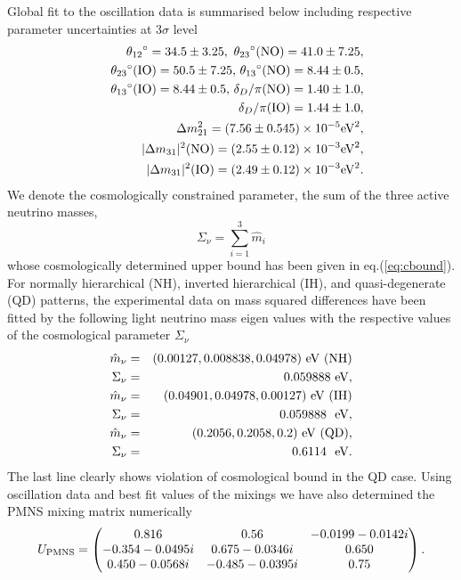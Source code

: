 \documentclass[a4paper,11pt]{article}
\newcommand{\be}{\begin{equation}}
\newcommand{\ee}{\end{equation}}
\newcommand{\bea}{\begin{eqnarray}}
\newcommand{\eea}{\end{eqnarray}}
\begin{document}
 Global fit to the oscillation data \cite{Salas:2017}  is summarised below
 including respective parameter uncertainties at  $3\sigma$ level
\begin{eqnarray}
&&\theta_{12}\/^{\circ}=34.5\pm 3.25,\,\, \theta_{23}\/^{\circ}({\rm NO})=41.0\pm 7.25,\nonumber \\
&& \theta_{23}\/^{\circ}({\rm IO})=50.5\pm 7.25,\,\theta_{13}\/^{\circ}({\rm NO})=8.44\pm0.5,\nonumber\\
&&\theta_{13}\/^{\circ}({\rm IO})=8.44\pm 0.5,\,\delta_{D}/\pi({\rm NO})=1.40\pm 1.0,\nonumber\\
 &&\delta_{D}/\pi({\rm IO})=1.44\pm 1.0,\nonumber \\
 &&\Delta m_{21}^2=(7.56\pm0.545)\times 10^{-5}{\rm eV}^2, \nonumber\\
&&|\Delta m_{31}|^2({\rm NO})=(2.55\pm 0.12)\times 10^{-3}{\rm eV}^2,\nonumber\\
&&|\Delta m_{31}|^2({\rm IO})=(2.49\pm 0.12)\times 10^{-3}{\rm eV}^2.
\label{oscdata}
\end{eqnarray}
We denote the cosmologically constrained parameter, the sum of the
three active neutrino masses, 
\be
\Sigma_{\nu}={\sum}_{i=1}^3 {\hat m}_i \label{eq:sumnu}
\ee
whose cosmologically determined upper bound has been given in eq.(\ref{eq:cbound}).
For normally hierarchical (NH), inverted hierarchical (IH), and
quasi-degenerate (QD) patterns, the experimental data on  mass
squared differences have been fitted by the following  light
neutrino mass eigen values with the respective values of the cosmological
parameter $\Sigma_{\nu}$
\bea
{\hat m}_{\nu}&=& (0.00127, 0.008838 ,0.04978) ~{\rm eV}\,\, (\rm
{NH})\nonumber\\   
\Sigma_{\nu}&=&0.059888~{\rm eV},\nonumber\\ 
{\hat m}_{\nu}&=& ( 0.04901,0.04978,0.00127)~{\rm eV}\,\, (\rm {IH})\nonumber\\
\Sigma_{\nu}&=&0.059888~~{\rm eV},\nonumber\\ 
{\hat m}_{\nu}&=& (  0.2056,0.2058,0.2) ~{\rm eV}\,\, (\rm {QD}),\nonumber\\
\Sigma_{\nu}&=&0.6114  ~~{\rm eV}. 
\label{eq:mnusumnu}
\eea
The last line clearly shows violation of cosmological bound in the QD case.
Using oscillation data and best fit values of the mixings we have also determined the PMNS mixing matrix
numerically
\bea
U_{\rm {PMNS}}=\begin{pmatrix} 0.816&0.56&-0.0199-0.0142i\\
-0.354-0.0495i&0.675-0.0346i&0.650\\
0.450-0.0568i&-0.485-0.0395i&0.75\end{pmatrix}.\label{eq:numupmns} 
\eea
\end{document}

